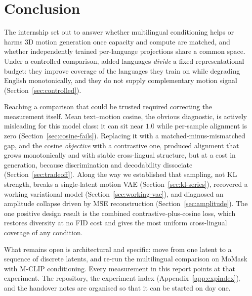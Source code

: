 \documentclass[11pt,a4paper]{report}
\begin{document}
\chapter{Conclusion}
\label{ch:conclusion}

The internship set out to answer whether multilingual conditioning helps or
harms 3D motion generation once capacity and compute are matched, and
whether independently trained per-language projections share a common
space. Under a controlled comparison, added languages \emph{divide} a fixed
representational budget: they improve coverage of the languages they train
on while degrading English monotonically, and they do not supply
complementary motion signal (Section~\ref{sec:controlled}).

Reaching a comparison that could be trusted required correcting the
measurement itself. Mean text--motion cosine, the obvious diagnostic, is
actively misleading for this model class: it can sit near $1.0$ while
per-sample alignment is zero (Section~\ref{sec:cosine-fails}). Replacing it
with a matched-minus-mismatched gap, and the cosine \emph{objective} with a
contrastive one, produced alignment that grows monotonically and with
stable cross-lingual structure, but at a cost in generation, because
discrimination and decodability dissociate (Section~\ref{sec:tradeoff}).
Along the way we established that sampling, not KL strength, breaks a
single-latent motion VAE (Section~\ref{sec:kl-series}), recovered a working
variational model (Section~\ref{sec:working-vae}), and diagnosed an
amplitude collapse driven by MSE reconstruction
(Section~\ref{sec:amplitude}). The one positive design result is the
combined contrastive-plus-cosine loss, which restores diversity at no FID
cost and gives the most uniform cross-lingual coverage of any condition.

What remains open is architectural and specific: move from one latent to a
sequence of discrete latents, and re-run the multilingual comparison on
MoMask with M-CLIP conditioning. Every measurement in this report points at
that experiment. The repository, the experiment index
(Appendix~\ref{app:expindex}), and the handover notes are organised so that
it can be started on day one.




\appendix
\end{document}
